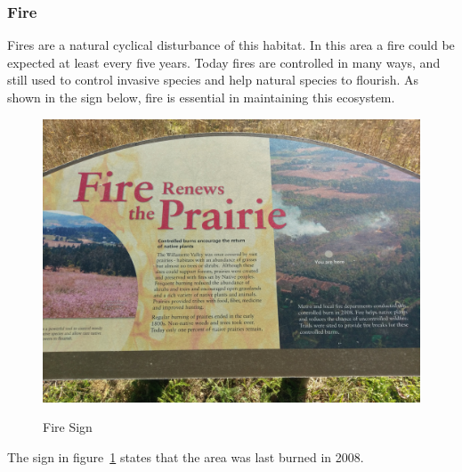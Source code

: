 \documentclass{article}
\begin{document}
\subsubsection{Fire}\label{ssub:fire}
Fires are a natural cyclical disturbance of this habitat. In this area a fire could be expected at least every five years. 
Today fires are controlled in many ways, and still used to control invasive species and 
help natural species to flourish. As shown in the sign below, fire is essential 
in maintaining this ecosystem.
\begin{figure}[H]
\centering{}
\caption{Fire Sign}
\includegraphics[scale=0.05]{fire_renews_the_prarie.jpg}
\label{fire}
\end{figure}

The sign in figure~\ref{fire} states that the area was last burned in 2008.
\end{document}
